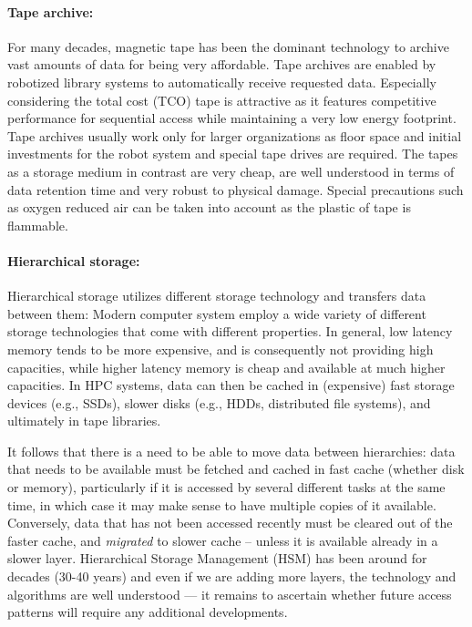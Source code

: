 \paragraph{Tape archive:}
For many decades, magnetic tape has been the dominant technology to archive vast amounts of data for being very affordable.
Tape archives are enabled by robotized library systems to automatically receive requested data.
Especially considering the total cost (TCO) tape is attractive as it features competitive performance for sequential access while maintaining a very low energy footprint.
Tape archives usually work only for larger organizations as floor space and initial investments for the robot system and special tape drives are required.
The tapes as a storage medium in contrast are very cheap, are well understood in terms of data retention time and very robust to physical damage.
Special precautions such as oxygen reduced air can be taken into account as the plastic of tape is flammable.


\paragraph{Hierarchical storage:}
Hierarchical storage utilizes different storage technology and transfers data between them:
Modern computer system employ a wide variety of different storage technologies that come with different properties.
In general, low latency memory tends to be more expensive, and is consequently not providing high capacities, while
higher latency memory is cheap and available at much higher capacities.
In HPC systems, data can then be cached in (expensive) fast storage devices (e.g., SSDs), slower disks (e.g., HDDs, distributed file systems), and ultimately in tape libraries.


It follows that there is a need to be able to move data between hierarchies: data that needs to be available must be fetched and cached in fast cache (whether disk or memory), particularly if it is accessed by several different tasks at the same time, in which case it may make sense to have multiple copies of it available.
Conversely, data that has not been accessed recently must be cleared out of the faster cache, and \emph{migrated} to slower cache -- unless it is available already in a slower layer.
Hierarchical Storage Management (HSM) has been around for decades (30-40 years) and even if we are adding more layers, the technology and algorithms are well understood --- it remains to ascertain whether future access patterns will require any additional developments. %


